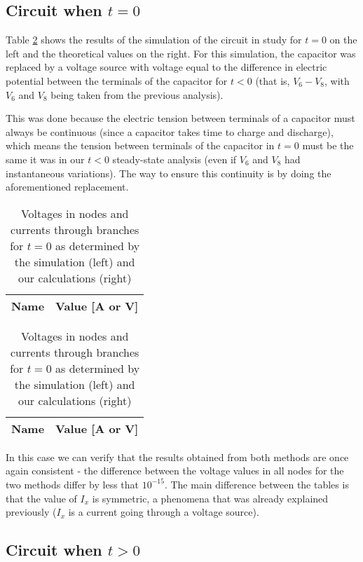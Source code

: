 \subsection{Circuit when $t=0$}

Table \ref{tab:comparison2} shows the results of the simulation of the circuit in study for $t=0$ on the left and the theoretical values on the right. For this simulation, the capacitor was replaced by a voltage source with voltage equal to the difference in electric potential between the terminals of the capacitor for $t<0$ (that is, $V_6 - V_8$, with $V_6$ and $V_8$ being taken from the previous analysis).


This was done because the electric tension between terminals of a capacitor must always be continuous (since a capacitor takes time to charge and discharge), which means the tension between terminals of the capacitor in $t=0$ must be the same it was in our $t<0$ steady-state analysis (even if $V_6$ and $V_8$ had instantaneous variations). The way to ensure this continuity is by doing the aforementioned replacement.

\begin{table}[H]
  \centering
  \begin{tabular}{|c|c|}
    \hline    
    {\bf Name} & {\bf Value [A or V]} \\ \hline
    
  \end{tabular}
  \begin{tabular}{|c|c|}
    \hline    
    {\bf Name} & {\bf Value [A or V]} \\ \hline
    
  \end{tabular}
  \caption{Voltages in nodes and currents through branches for $t=0$ as determined by the simulation (left) and our calculations (right)}
  \label{tab:comparison2}
\end{table}

In this case we can verify that the results obtained from both methods are once again consistent - the difference between the voltage values in all nodes for the two methods differ by less that $10^{-15}$. 
The main difference between the tables is that the value of $I_x$  is symmetric, a phenomena that was already explained previously ($I_x$ is a current going through a voltage source).



\subsection{Circuit when $t>0$}

